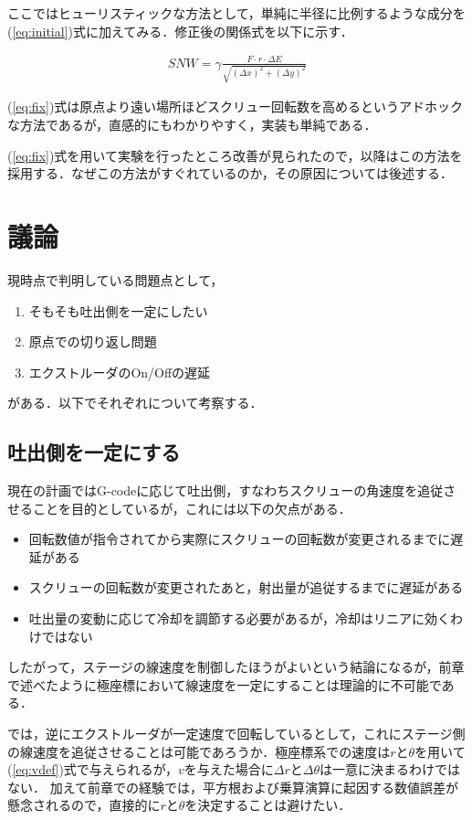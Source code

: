 \documentclass[twocolumn,oneside,a4paper]{article}
\begin{document}
ここではヒューリスティックな方法として，単純に半径に比例するような成分を(\ref{eq:initial})式に加えてみる．修正後の関係式を以下に示す．

\begin{eqnarray}\label{eq:fix}
  SNW = \gamma \frac{F\cdot r\cdot  \Delta E}{\sqrt{(\Delta x)^2+(\Delta y)^2}} 
\end{eqnarray}

(\ref{eq:fix})式は原点より遠い場所ほどスクリュー回転数を高めるというアドホックな方法であるが，直感的にもわかりやすく，実装も単純である．

(\ref{eq:fix})式を用いて実験を行ったところ改善が見られたので，以降はこの方法を採用する．なぜこの方法がすぐれているのか，その原因については後述する．

\section{議論}
現時点で判明している問題点として，

\begin{enumerate}
	\item そもそも吐出側を一定にしたい
	\item 原点での切り返し問題
	\item エクストルーダのOn/Offの遅延
\end{enumerate}

がある．以下でそれぞれについて考察する．

\subsection{吐出側を一定にする}
現在の計画ではG-codeに応じて吐出側，すなわちスクリューの角速度を追従させることを目的としているが，これには以下の欠点がある．

\begin{itemize}
    \item 回転数値が指令されてから実際にスクリューの回転数が変更されるまでに遅延がある
    \item スクリューの回転数が変更されたあと，射出量が追従するまでに遅延がある
	\item 吐出量の変動に応じて冷却を調節する必要があるが，冷却はリニアに効くわけではない
\end{itemize}

したがって，ステージの線速度を制御したほうがよいという結論になるが，前章で述べたように極座標において線速度を一定にすることは理論的に不可能である．

では，逆にエクストルーダが一定速度で回転しているとして，これにステージ側の線速度を追従させることは可能であろうか．極座標系での速度は$r$と$\theta$を用いて(\ref{eq:vdef})式で与えられるが，$v$を与えた場合に$\Delta r$と$\Delta \theta$は一意に決まるわけではない．
加えて前章での経験では，平方根および乗算演算に起因する数値誤差が懸念されるので，直接的に$r$と$\theta$を決定することは避けたい．
\end{document}
